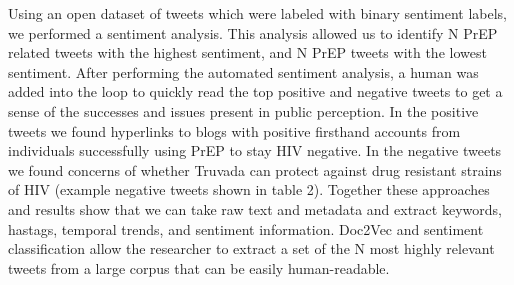 Using an open dataset of tweets which were labeled with binary sentiment labels, we performed a sentiment analysis. This analysis allowed us to identify N PrEP related tweets with the highest sentiment, and N PrEP tweets with the lowest sentiment. After performing the automated sentiment analysis, a human was added into the loop to quickly read the top positive and negative tweets to get a sense of the successes and issues present in public perception. In the positive tweets we found hyperlinks to blogs with positive firsthand accounts from individuals successfully using PrEP to stay HIV negative. In the negative tweets we found concerns of whether Truvada can protect against drug resistant strains of HIV (example negative tweets shown in table 2). Together these approaches and results show that we can take raw text and metadata and extract keywords, hastags, temporal trends, and sentiment information. Doc2Vec and sentiment classification allow the researcher to extract a set of the N most highly relevant tweets from a large corpus that can be easily human-readable.

